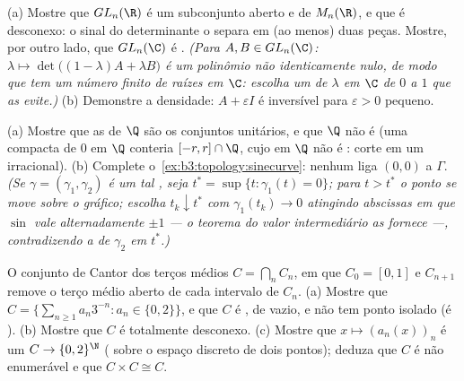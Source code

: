 \begin{exercise}[$\star\star$]\label{exo:b3:topology:8}
(a) Mostre que $GL_n(\R)$ é um subconjunto aberto e  de $M_n(\R)$, e que é
desconexo: o sinal do determinante o separa em (ao menos) duas peças.
Mostre, por outro lado, que $GL_n(\C)$ é . \emph{(Para
$A, B \in GL_n(\C)$: $\lambda \mapsto \det\bigl((1 -
\lambda)A + \lambda B\bigr)$ é um polinômio não identicamente nulo, de modo que tem um
número finito de raízes em $\C$: escolha um  de $\lambda$ em
$\C$ de $0$ a $1$ que as evite.)}
(b) Demonstre a densidade: $A + \varepsilon I$ é inversível para $\varepsilon > 0$ pequeno.
\end{exercise}

\begin{exercise}[$\star\star$]\label{exo:b3:topology:9}
(a) Mostre que as  de $\Q$ são os conjuntos
unitários, e que $\Q$ não é  (uma 
compacta de $0$ em $\Q$ conteria $[-r, r]\cap\Q$, cujo  em $\Q$
não é : corte em um irracional).
(b) Complete o~\cref{ex:b3:topology:sinecurve}: nenhum  liga $(0,0)$ a
$\Gamma$. \emph{(Se $\gamma = (\gamma_1, \gamma_2)$ é um tal , seja $t^* = \sup\{t : \gamma_1(t) = 0\}$; para $t
> t^*$ o
ponto se move sobre o gráfico; escolha $t_k \downarrow
t^*$ com $\gamma_1(t_k) \to 0$ atingindo
abscissas em que $\sin$ vale alternadamente $\pm1$ --- o teorema
do valor intermediário as fornece ---, contradizendo a  de
$\gamma_2$ em $t^*$.)}
\end{exercise}

\begin{exercise}[$\star\star\star$]\label{exo:b3:topology:10}
O conjunto de Cantor dos terços médios $C = \bigcap_n C_n$, em que $C_0 =
[0,1]$ e $C_{n+1}$
remove o terço médio aberto de cada intervalo de $C_n$.
(a) Mostre que $C = \bigl\{\sum_{n\geq1} a_n3^{-n} : a_n \in
\{0,2\}\bigr\}$, e que $C$ é , de  vazio, e não
tem ponto isolado (é \emph{}).
(b) Mostre que $C$ é totalmente desconexo.
(c) Mostre que $x \mapsto (a_n(x))_n$ é um  $C \to
\{0,2\}^\N$ ( sobre o
espaço discreto de dois pontos); deduza que $C$ é não enumerável e
que $C \times C
\cong C$.
\end{exercise}

